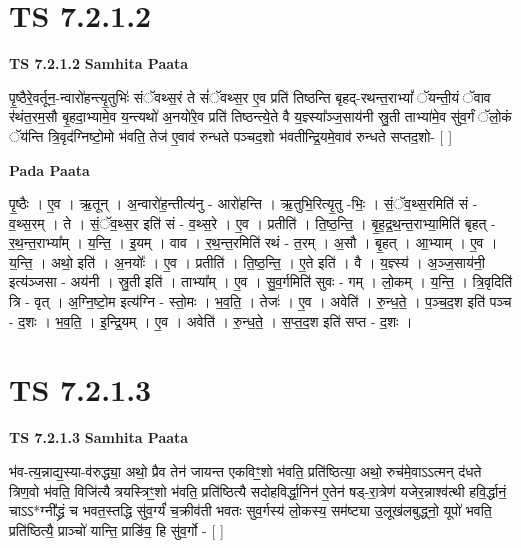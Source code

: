 \documentclass[17pt]{extarticle}
\begin{document}

\section{ TS 7.2.1.2 }

\textbf{TS 7.2.1.2 } \newline
\textbf{Samhita Paata} \newline

पृ॒ष्ठैरे॒वर्तून॒-न्वारो॑हन्त्यृ॒तुभिः॑ संॅवथ्स॒रं ते सं॑ॅवथ्स॒र ए॒व प्रति॑ तिष्ठन्ति बृहद्-रथन्त॒राभ्यां᳚ ॅयन्ती॒यं ॅवाव र॑थंत॒रम॒सौ बृ॒हदा॒भ्यामे॒व य॒न्त्यथो॑ अ॒नयो॑रे॒व प्रति॑ तिष्ठन्त्ये॒ते वै य॒ज्ञ्स्या᳚ञ्ज॒साय॑नी स्रु॒ती ताभ्या॑मे॒व सु॑व॒र्गं ॅलो॒कं ॅय॑न्ति त्रि॒वृद॑ग्निष्टो॒मो भ॑वति॒ तेज॑ ए॒वाव॑ रुन्धते पञ्चद॒शो भ॑वतीन्द्रि॒यमे॒वाव॑ रुन्धते सप्तद॒शो- [  ] \newline

\textbf{Pada Paata} \newline

पृ॒ष्ठैः । ए॒व । ऋ॒तून् । अ॒न्वारो॑ह॒न्तीत्य॑नु - आरो॑हन्ति । ऋ॒तुभि॒रित्यृ॒तु -भिः॒ । सं॒ॅव॒थ्स॒रमिति॑ सं - व॒थ्स॒रम् । ते । सं॒ॅव॒थ्स॒र इति॑ सं - व॒थ्स॒रे । ए॒व । प्रतीति॑ । ति॒ष्ठ॒न्ति॒ । बृ॒ह॒द्र॒थ॒न्त॒राभ्या॒मिति॑ बृहत् - र॒थ॒न्त॒राभ्या᳚म् । य॒न्ति॒ । इ॒यम् । वाव । र॒थ॒न्त॒रमिति॑ रथं - त॒रम् । अ॒सौ । बृ॒हत् । आ॒भ्याम् । ए॒व । य॒न्ति॒ । अथो॒ इति॑ । अ॒नयोः᳚ । ए॒व । प्रतीति॑ । ति॒ष्ठ॒न्ति॒ । ए॒ते इति॑ । वै । य॒ज्ञ्स्य॑ । अ॒ञ्ज॒साय॑नी॒ इत्य॑ञ्जसा - अय॑नी । स्रु॒ती इति॑ । ताभ्या᳚म् । ए॒व । सु॒व॒र्गमिति॑ सुवः - गम् । लो॒कम् । य॒न्ति॒ । त्रि॒वृदिति॑ त्रि - वृत् । अ॒ग्नि॒ष्टो॒म इत्य॑ग्नि - स्तो॒मः । भ॒व॒ति॒ । तेजः॑ । ए॒व । अवेति॑ । रु॒न्ध॒ते॒ । प॒ञ्च॒द॒श इति॑ पञ्च - द॒शः । भ॒व॒ति॒ । इ॒न्द्रि॒यम् । ए॒व । अवेति॑ । रु॒न्ध॒ते॒ । स॒प्त॒द॒श इति॑ सप्त - द॒शः ।  \newline





\section{ TS 7.2.1.3 }

\textbf{TS 7.2.1.3 } \newline
\textbf{Samhita Paata} \newline

भ॑व-त्य॒न्नाद्य॒स्या-व॑रुद्ध्या॒ अथो॒ प्रैव तेन॑ जायन्त एकविꣳ॒॒शो भ॑वति॒ प्रति॑ष्ठित्या॒ अथो॒ रुच॑मे॒वाऽऽत्मन् द॑धते त्रिण॒वो भ॑वति॒ विजि॑त्यै त्रयस्त्रिꣳ॒॒शो भ॑वति॒ प्रति॑ष्ठित्यै सदोहविर्द्धा॒निन॑ ए॒तेन॑ षड्-रा॒त्रेण॑ यजेर॒न्नाश्व॑त्थी हवि॒र्द्धानं॒ चाऽऽ*ग्नी᳚द्ध्रं च भवत॒स्तद्धि सु॑व॒र्ग्यं॑ च॒क्रीव॑ती भवतः सुव॒र्गस्य॑ लो॒कस्य॒ सम॑ष्ट्या उ॒लूख॑लबुद्ध्नो॒ यूपो॑ भवति॒ प्रति॑ष्ठित्यै॒ प्राञ्चो॑ यान्ति॒ प्राङि॑व॒ हि सु॑व॒र्गो - [  ] \newline
\end{document}
